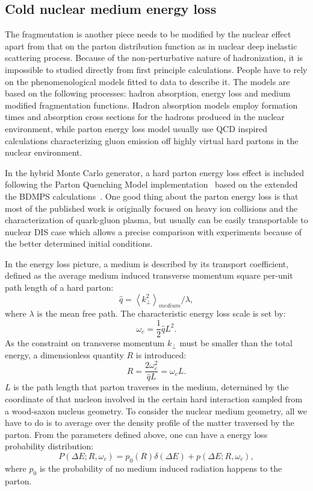 \subsection{Cold nuclear medium energy loss}
The fragmentation is another piece needs to be modified by the nuclear effect
apart from that on the parton distribution function as in nuclear deep inelastic
scattering process. Because of the non-perturbative nature of hadronization, it
is impossible to studied directly from first principle calculations. People have
to rely on the phenomenological models fitted to data to describe it. The models
are based on the following processes: hadron absorption, energy loss and medium
modified fragmentation functions. Hadron absorption models employ formation
times and absorption cross sections for the hadrons produced in the nuclear
environment, while parton energy loss model usually use QCD inspired
calculations characterizing gluon emission off highly virtual hard partons in
the nuclear environment.

In the hybrid Monte Carlo generator, a hard parton energy loss effect is
included following the Parton Quenching Model
implementation~\cite{Dupre:2011afa} based on
the extended the BDMPS calculations~\cite{Salgado:2003gb}. One good thing about the parton energy loss is
that most of the published work is originally focused on heavy ion collisions
and the characterization of quark-gluon plasma, but usually can be easily
transportable to nuclear DIS case which allows a precise comparison with
experiments because of the better determined initial conditions.

In the energy loss picture, a medium is described by its transport coefficient,
defined as the average medium induced transverse momentum square per-unit path
length of a hard parton:
\begin{equation}
\hat{q} = \left\langle k^{2}_{\perp}\right\rangle _{medium}/\lambda,
\end{equation}
where $\lambda$ is the mean free path. The characteristic energy loss scale is set by:
\begin{equation}
\omega_{c} = \frac{1}{2}\hat{q}L^{2}.
\end{equation}
As the constraint on transverse momentum $k_{\perp}$ must be smaller than the
total energy, a dimensionless quantity $R$ is introduced:
\begin{equation}
R = \frac{2\omega^{2}_{c}}{\hat{q}L} = \omega_{c}L.
\end{equation}
$L$ is the path length that parton traverses in the medium, determined by the
coordinate of that nucleon involved in the certain hard interaction sampled from
a wood-saxon nucleus geometry. To consider the nuclear medium geometry, all we
have to do is to average over the density profile of the matter traversed by the
parton. From the parameters defined above, one can have a energy loss
probability distribution:
\begin{equation}
P(\Delta E; R, \omega_{c}) = p_{0}(R)\delta(\Delta E) + p(\Delta E; R, \omega_{c}),
\end{equation}
where $p_{0}$ is the probability of no medium induced radiation happens to the parton.


